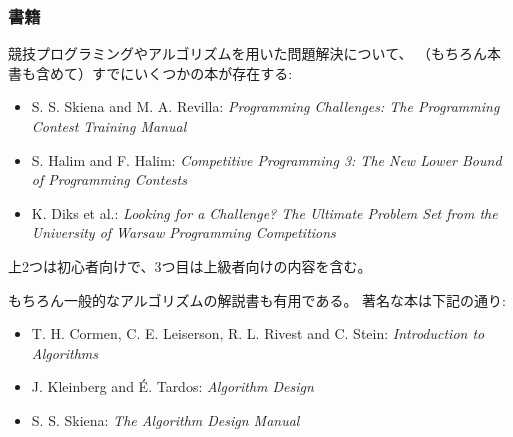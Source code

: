 \subsubsection{書籍}

競技プログラミングやアルゴリズムを用いた問題解決について、
（もちろん本書も含めて）すでにいくつかの本が存在する:

\begin{itemize}
\item S. S. Skiena and M. A. Revilla:
\emph{Programming Challenges: The Programming Contest Training Manual} \cite{ski03}
\item S. Halim and F. Halim:
\emph{Competitive Programming 3: The New Lower Bound of Programming Contests} \cite{hal13}
\item K. Diks et al.: \emph{Looking for a Challenge? The Ultimate Problem Set from
the University of Warsaw Programming Competitions} \cite{dik12}
\end{itemize}

上2つは初心者向けで、3つ目は上級者向けの内容を含む。

もちろん一般的なアルゴリズムの解説書も有用である。
著名な本は下記の通り:

\begin{itemize}
\item T. H. Cormen, C. E. Leiserson, R. L. Rivest and C. Stein:
\emph{Introduction to Algorithms} \cite{cor09}
\item J. Kleinberg and É. Tardos:
\emph{Algorithm Design} \cite{kle05}
\item S. S. Skiena:
\emph{The Algorithm Design Manual} \cite{ski08}
\end{itemize}
